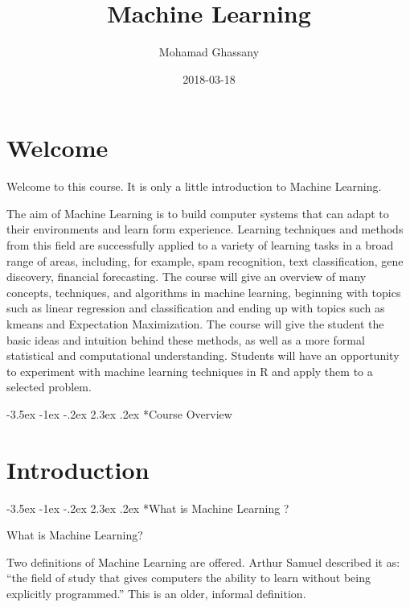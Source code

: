 \documentclass[]{book}
\title{Machine Learning}
\author{Mohamad Ghassany}
\date{2018-03-18}
\makeatletter
\renewcommand\section{\@startsection {section}{1}{\z@}%
                                   {-3.5ex \@plus -1ex \@minus -.2ex}%
                                   {2.3ex \@plus.2ex}%
                                   {\normalfont\Large\bfseries\color{ForestGreen}}}
\theoremstyle{definition}
\theoremstyle{definition}
\theoremstyle{definition}
\theoremstyle{remark}
\makeatother
\begin{document}
\maketitle

{
\setcounter{tocdepth}{2}
\tableofcontents
}
\chapter*{Welcome}\label{welcome}

Welcome to this course. It is only a little introduction to Machine
Learning.

The aim of Machine Learning is to build computer systems that can adapt
to their environments and learn form experience. Learning techniques and
methods from this field are successfully applied to a variety of
learning tasks in a broad range of areas, including, for example, spam
recognition, text classification, gene discovery, financial forecasting.
The course will give an overview of many concepts, techniques, and
algorithms in machine learning, beginning with topics such as linear
regression and classification and ending up with topics such as kmeans
and Expectation Maximization. The course will give the student the basic
ideas and intuition behind these methods, as well as a more formal
statistical and computational understanding. Students will have an
opportunity to experiment with machine learning techniques in R and
apply them to a selected problem.

\section*{Course Overview}\label{course-overview}

\chapter*{Introduction}\label{introduction}

\section*{What is Machine Learning ?}\label{what-is-machine-learning}

What is Machine Learning?

Two definitions of Machine Learning are offered. Arthur Samuel described
it as: ``the field of study that gives computers the ability to learn
without being explicitly programmed.'' This is an older, informal
definition.
\end{document}
